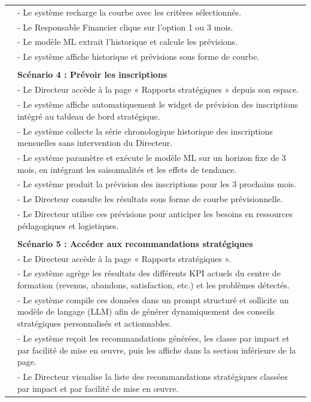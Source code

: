 {\begin{longtable}{|l|p{12cm}|}
&- Le système recharge la courbe avec les critères sélectionnés. \\
&- Le Responsable Financier clique sur l'option 1 ou 3 mois. \\
&- Le modèle ML extrait l'historique et calcule les prévisions. \\
&- Le système affiche historique et prévisions sous forme de courbe. \\
\\
& \textbf{Scénario 4 : Prévoir les inscriptions} \\
&- Le Directeur accède à la page « Rapports stratégiques » depuis son espace. \\
&- Le système affiche automatiquement le widget de prévision des inscriptions intégré au tableau de bord stratégique. \\
&- Le système collecte la série chronologique historique des inscriptions mensuelles sans intervention du Directeur. \\
&- Le système paramètre et exécute le modèle ML sur un horizon fixe de 3 mois, en intégrant les saisonnalités et les effets de tendance. \\
&- Le système produit la prévision des inscriptions pour les 3 prochains mois. \\
&- Le Directeur consulte les résultats sous forme de courbe prévisionnelle. \\
&- Le Directeur utilise ces prévisions pour anticiper les besoins en ressources pédagogiques et logistiques. \\
\\
& \textbf{Scénario 5 : Accéder aux recommandations stratégiques} \\
&- Le Directeur accède à la page « Rapports stratégiques ». \\
&- Le système agrège les résultats des différents KPI actuels du centre de formation (revenus, abandons, satisfaction, etc.) et les problèmes détectés. \\
&- Le système compile ces données dans un prompt structuré et sollicite un modèle de langage (LLM) afin de générer dynamiquement des conseils stratégiques personnalisés et actionnables. \\
&- Le système reçoit les recommandations générées, les classe par impact et par facilité de mise en œuvre, puis les affiche dans la section inférieure de la page. \\
&- Le Directeur visualise la liste des recommandations stratégiques classées par impact et par facilité de mise en œuvre. \\
\hline


\end{longtable}}
